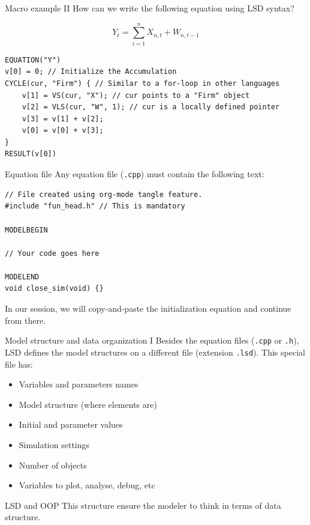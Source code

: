 \documentclass[bigger,aspectratio=169]{beamer}
\begin{document}
\begin{frame}[label={sec:org6d0d8e0},fragile]{Macro example II}
 How can we write the following equation using LSD syntax?

\[Y_{t} = \sum_{i=1}^{n} X_{n,t} + W_{n,t-1}\]



\begin{verbatim}
EQUATION("Y")
v[0] = 0; // Initialize the Accumulation
CYCLE(cur, "Firm") { // Similar to a for-loop in other languages
    v[1] = VS(cur, "X"); // cur points to a "Firm" object
    v[2] = VLS(cur, "W", 1); // cur is a locally defined pointer
    v[3] = v[1] + v[2];
    v[0] = v[0] + v[3];
}
RESULT(v[0])
\end{verbatim}
\end{frame}
\begin{frame}[label={sec:org1c1430b},fragile]{Equation file}
 Any equation file (\texttt{.cpp}) must contain the following text:
\begin{verbatim}
// File created using org-mode tangle feature.
#include "fun_head.h" // This is mandatory

MODELBEGIN

// Your code goes here

MODELEND
void close_sim(void) {}
\end{verbatim}

In our session, we will copy-and-paste the initialization equation and continue from there.
\end{frame}
\begin{frame}[label={sec:org1454060},fragile]{Model structure and data organization I}
 Besides the equation files (\texttt{.cpp} or \texttt{.h}), LSD defines the model structures on a different file (extension \texttt{.lsd}).
This special file has:

\begin{itemize}
\item Variables and parameters names
\item Model structure (where elements are)
\item Initial and parameter values
\item Simulation settings
\item Number of objects
\item Variables to plot, analyse, debug, etc
\end{itemize}
\begin{block}{LSD and OOP}
This structure ensure the modeler to think in terms of data structure.
\end{block}
\end{frame}
\end{document}
